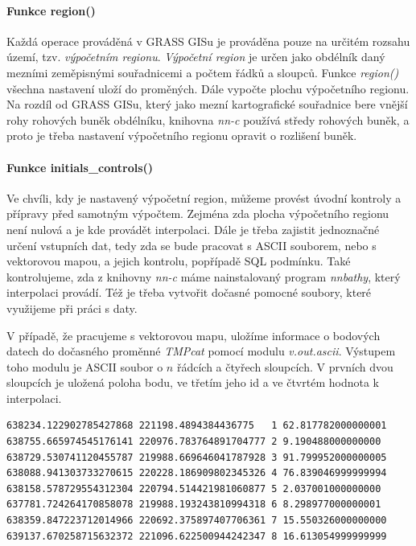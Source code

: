 \documentclass[12pt,a4paper]{article}
\begin{document}
\bigskip
\paragraph{Funkce region()}

Každá operace prováděná v GRASS GISu je prováděna pouze na určitém
rozsahu území, tzv. \emph{výpočetním regionu}. \emph{Výpočetní region}
je určen jako obdélník daný mezními zeměpisnými souřadnicemi a
počtem řádků a sloupců.  Funkce \emph{region()} všechna nastavení
uloží do proměných. Dále vypočte plochu výpočetního regionu. Na rozdíl
od GRASS GISu, který jako mezní kartografické souřadnice bere vnější
rohy rohových buněk obdélníku, knihovna \emph{nn-c} používá středy
rohových buněk, a proto je třeba nastavení výpočetního regionu opravit
o rozlišení buněk.

\bigskip
\paragraph{Funkce initials\_controls()}

Ve chvíli, kdy je nastavený výpočetní region, můžeme provést úvodní
kontroly a přípravy před samotným výpočtem. Zejména zda plocha
výpočetního regionu není nulová a je kde provádět interpolaci. Dále je
třeba zajistit jednoznačné určení vstupních dat, tedy zda se bude
pracovat s ASCII souborem, nebo s vektorovou mapou, a jejich kontrolu,
popřípadě SQL podmínku. Také kontrolujeme, zda z knihovny \emph{nn-c}
máme nainstalovaný program \emph{nnbathy}, který interpolaci
provádí. Též je třeba vytvořit dočasné pomocné soubory, které
využijeme při práci s daty.

V případě, že pracujeme s vektorovou mapu, uložíme informace o
bodových datech do dočasného proměnné \emph{TMPcat} pomocí modulu
\emph{v.out.ascii}. Výstupem toho modulu je ASCII soubor o $n$ řádcích
a čtyřech sloupcích. V prvních dvou sloupcích je uložená poloha bodu,
ve třetím jeho id a ve čtvrtém hodnota k interpolaci.

\bigskip
\lstset{basicstyle=\footnotesize}
\begin{lstlisting}[caption={Pomocný soubor TMPcat}]
638234.122902785427868 221198.4894384436775   1 62.817782000000001
638755.665974545176141 220976.783764891704777 2 9.190488000000000
638729.530741120455787 219988.669646041787928 3 91.799952000000005
638088.941303733270615 220228.186909802345326 4 76.839046999999994
638158.578729554312304 220794.514421981060877 5 2.037001000000000
637781.724264170858078 219988.193243810994318 6 8.298977000000001
638359.847223712014966 220692.375897407706361 7 15.550326000000000
639137.670258715632372 221096.622500944242347 8 16.613054999999999
\end{lstlisting}
\end{document}
